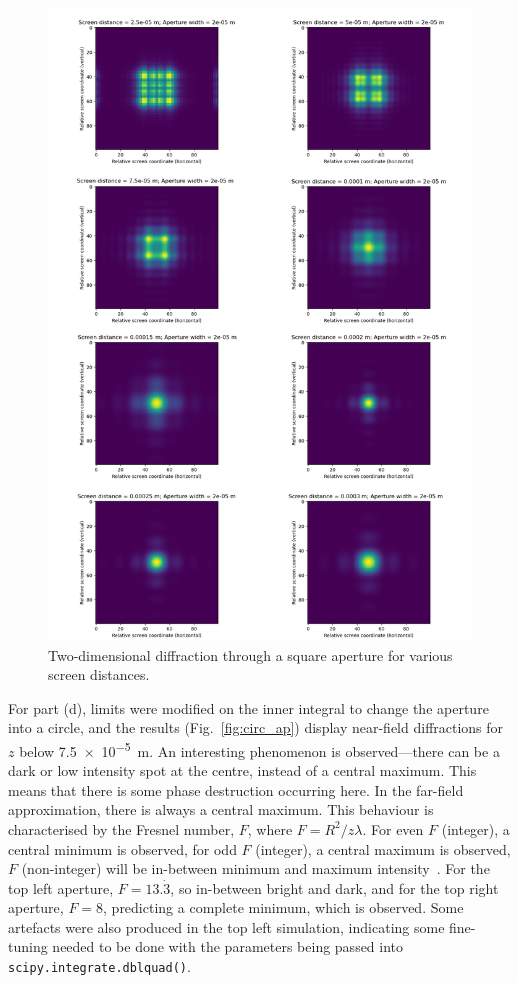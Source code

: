 \documentclass[hyphens,twocolumn,nobalancelastpage,aps,10pt,citeautoscript,longbibliography]{revtex4-2}
\begin{document}
\begin{figure}[htpb] \centering
	\includegraphics[width=1\linewidth]{./assets/square_apertures/combined.png}
	\caption{Two-dimensional diffraction through a square aperture for various screen distances.}%
	\label{fig:square_ap}
\end{figure}

For part (d), limits were modified on the inner integral to change the aperture
into a circle, and the results (Fig.~\ref{fig:circ_ap}) display near-field
diffractions for $z$ below \qty{7.5e-5}{\metre}. An interesting phenomenon is
observed---there can be a dark or low intensity spot at the centre, instead of
a central maximum. This means that there is some phase destruction occurring
here. In the far-field approximation, there is always a central maximum. This
behaviour is characterised by the Fresnel number, $F$, where $F =
	R^2/z\lambda$. For even $F$ (integer), a central minimum is observed, for odd
$F$ (integer), a central maximum is observed, $F$ (non-integer) will be
in-between minimum and maximum intensity~\cite{fd}. For the top left aperture, $F =
	13.\dot{3}$, so in-between bright and dark, and for the top right aperture, $F
	= 8$, predicting a complete minimum, which is observed. Some artefacts were
also produced in the top left simulation, indicating some fine-tuning needed to
be done with the parameters being passed into
\lstinline{scipy.integrate.dblquad()}.
\end{document}
